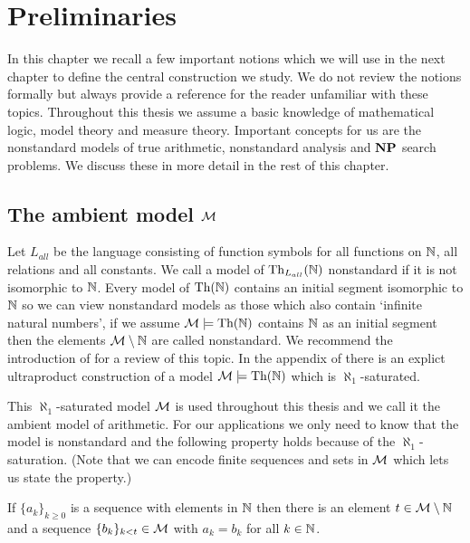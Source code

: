 \chapter*{Preliminaries}

In this chapter we recall a few important notions which we will use in the next chapter to define the central construction we study. We do not review the notions formally but always provide a reference for the reader unfamiliar with these topics. Throughout this thesis we assume a basic knowledge of mathematical logic, model theory and measure theory. Important concepts for us are the nonstandard models of true arithmetic, nonstandard analysis and $\textbf{NP}$ search problems. We discuss these in more detail in the rest of this chapter.

\section*{The ambient model \texorpdfstring{$\mathcal{M}$}{M}}

Let $L_{all}$ be the language consisting of function symbols for all functions on $\mathbb{N}$, all relations and all constants. We call a model of $\text{Th}_{L_{all}}(\mathbb{N})$ nonstandard if it is not isomorphic to $\mathbb{N}$. Every model of $\text{Th}(\mathbb{N})$ contains an initial segment isomorphic to $\mathbb{N}$ so we can view nonstandard models as those which also contain `infinite natural numbers', if we assume $\mathcal{M}\models \text{Th}(\mathbb{N})$ contains $\mathbb{N}$ as an initial segment then the elements $\mathcal{M}\setminus \mathbb{N}$ are called nonstandard. We recommend the introduction of \cite{kaye1991pa} for a review of this topic. In the appendix of \cite{krajicek2010forcing} there is an explict ultraproduct construction of a model $\mathcal{M}\models \text{Th}(\mathbb{N})$ which is $\aleph_1$-saturated.

This $\aleph_1$-saturated model $\mathcal{M}$ is used throughout this thesis and we call it the ambient model of arithmetic. For our applications we only need to know that the model is nonstandard and the following property holds because of the $\aleph_1$-saturation. (Note that we can encode finite sequences and sets in $\mathcal{M}$ which lets us state the property.)

\begin{prope}
If $\{a_k\}_{k\geq 0}$ is a sequence with elements in $\mathbb{N}$ then there is an element $t\in \mathcal{M} \setminus \mathbb{N}$ and a sequence $\{b_k\}_{k<t}\in \mathcal{M}$ with $a_k=b_k$ for all $k\in \mathbb{N}$.
\end{prope}

